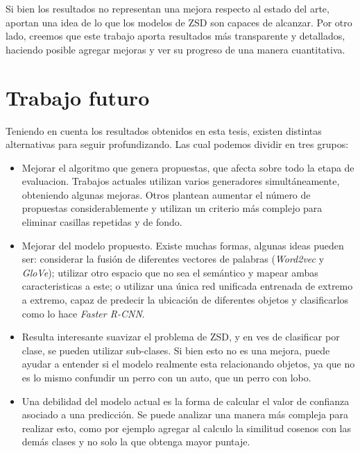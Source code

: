Si bien los resultados no representan una mejora respecto al estado del arte, aportan una idea de lo que los modelos de ZSD son capaces de alcanzar. Por otro lado, creemos que este trabajo aporta resultados más transparente y detallados, haciendo posible agregar mejoras y ver su progreso de una manera cuantitativa.


\section{Trabajo futuro} \label{sec:trabajo futuro}

Teniendo en cuenta los resultados obtenidos en esta tesis, existen distintas alternativas para seguir profundizando. Las cual podemos dividir en tres grupos:

\begin{itemize}
	\item Mejorar el algoritmo que genera propuestas, que afecta sobre todo la etapa de evaluacion. Trabajos actuales utilizan varios generadores simultáneamente, obteniendo algunas mejoras. Otros plantean aumentar el número de propuestas considerablemente y utilizan un criterio más complejo para eliminar casillas repetidas y de fondo.
	\item Mejorar del modelo propuesto. Existe muchas formas, algunas ideas pueden ser: considerar la fusión de diferentes vectores de palabras (\textit{Word2vec} y \textit{GloVe}); utilizar otro espacio que no sea el semántico y mapear ambas caracteristicas a este; o utilizar una única red unificada entrenada de extremo a extremo, capaz de predecir la ubicación de diferentes objetos y clasificarlos como lo hace \textit{Faster R-CNN}.
	\item Resulta interesante suavizar el problema de ZSD, y en ves de clasificar por clase, se pueden utilizar sub-clases. Si bien esto no es una mejora, puede ayudar a entender si el modelo realmente esta relacionando objetos, ya que no es lo mismo confundir un perro con un auto, que un perro con lobo.
	\item Una debilidad del modelo actual es la forma de calcular el valor de confianza asociado a una predicción. Se puede analizar una manera más compleja para realizar esto, como por ejemplo agregar al calculo la similitud cosenos con las demás clases y no solo la que obtenga mayor puntaje.
\end{itemize}


